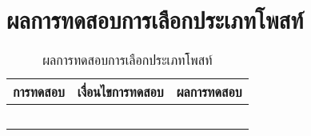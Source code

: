 \section{ผลการทดสอบการเลือกประเภทโพสท์}
\begin{table}[H]
	\caption{ผลการทดสอบการเลือกประเภทโพสท์}
    \centering	
	\label{tab:test7}
    \begin{tabular}{ | p{4cm} | p{4cm} | p{4cm} |  }
		\hline
	\multicolumn{1}{|c|}{การทดสอบ} & \multicolumn{1}{c|}{เงื่อนไขการทดสอบ} & \multicolumn{1}{c|}{ผลการทดสอบ}    \\ \hline
	\setstretch{1.0}{ทดสอบการเลือกประเภทโพสท์}
	& \setstretch{1.0}{ผู้ใช้เลือกประเภทโพสท์ทั้งหมด}
	& \setstretch{1.0}{ระบบจะแสดงโพสท์ทั้งหมด }  \\ \cline{2-3} 
	& \setstretch{1.0}{ผู้ใช้เลือกประเภทโพสท์ทั่วไป}
	& \setstretch{1.0}{ระบบจะแสดงโพสท์ทั่วไป } \\ \cline{2-3} 
	& \setstretch{1.0}{ผู้ใช้เลือกประเภทโพสท์กีฬา}
	& \setstretch{1.0}{ระบบจะแสดงโพสท์กีฬา } \\ \cline{2-3} 
	& \setstretch{1.0}{ผู้ใช้เลือกประเภทโพสท์ดนตรี}
	& \setstretch{1.0}{ระบบจะแสดงโพสท์ดนตรี } \\ \cline{2-3} 
	& \setstretch{1.0}{ผู้ใช้เลือกประเภทโพสท์ศาสนา} 
	& \setstretch{1.0}{ระบบจะแสดงโพสท์ศาสนา} \\ \hline
    \end{tabular}
\end{table}

